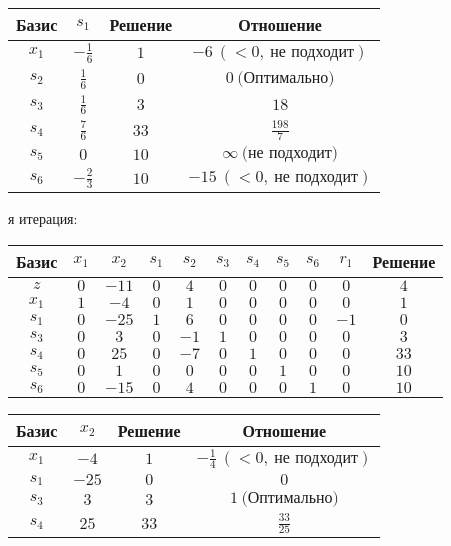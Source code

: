 \documentclass{article}%
\begin{document}
\begin{flushleft}
\begin{tabular}{|cccc|}%
\hline%
Базис&$s_{1}$&Решение&Отношение\\%
\hline%
$x_{1}$&$-\frac{1}{6}$&$1$&$-6\: (< 0, \: \text{не подходит})$\\%
$s_{2}$&$\frac{1}{6}$&$0$&$0\: \text{(Оптимально)}$\\%
$s_{3}$&$\frac{1}{6}$&$3$&$18$\\%
$s_{4}$&$\frac{7}{6}$&$33$&$\frac{198}{7}$\\%
$s_{5}$&$0$&$10$&$\infty \: \text{(не подходит)}$\\%
$s_{6}$&$-\frac{2}{3}$&$10$&$-15\: (< 0, \: \text{не подходит})$\\%
\hline%
\end{tabular}%
\newline%
\newline%
я итерация: %
\newline%
\newline%
\renewcommand{\arraystretch}{1.3}%
\begin{tabular}{|c|ccccccccc|c|}%
\hline%
Базис&$x_{1}$&$x_{2}$&$s_{1}$&$s_{2}$&$s_{3}$&$s_{4}$&$s_{5}$&$s_{6}$&$r_{1}$&Решение\\%
\hline%
$z$&$0$&$-11$&$0$&$4$&$0$&$0$&$0$&$0$&$0$&$4$\\%
\hline%
$x_{1}$&$1$&$-4$&$0$&$1$&$0$&$0$&$0$&$0$&$0$&$1$\\%
$s_{1}$&$0$&$-25$&$1$&$6$&$0$&$0$&$0$&$0$&$-1$&$0$\\%
$s_{3}$&$0$&$3$&$0$&$-1$&$1$&$0$&$0$&$0$&$0$&$3$\\%
$s_{4}$&$0$&$25$&$0$&$-7$&$0$&$1$&$0$&$0$&$0$&$33$\\%
$s_{5}$&$0$&$1$&$0$&$0$&$0$&$0$&$1$&$0$&$0$&$10$\\%
$s_{6}$&$0$&$-15$&$0$&$4$&$0$&$0$&$0$&$1$&$0$&$10$\\%
\hline%
\end{tabular}%
\newline%
\newline%
\newline%
\begin{tabular}{|cccc|}%
\hline%
Базис&$x_{2}$&Решение&Отношение\\%
\hline%
$x_{1}$&$-4$&$1$&$-\frac{1}{4}\: (< 0, \: \text{не подходит})$\\%
$s_{1}$&$-25$&$0$&$0$\\%
$s_{3}$&$3$&$3$&$1\: \text{(Оптимально)}$\\%
$s_{4}$&$25$&$33$&$\frac{33}{25}$\\%

\end{tabular}
\end{flushleft}
\end{document}
